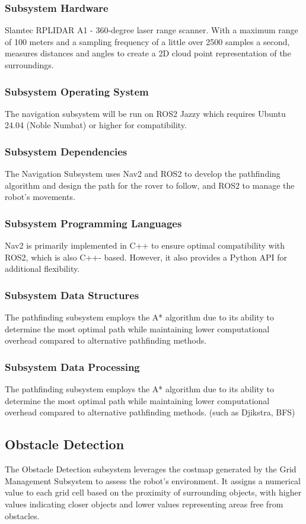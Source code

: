 \subsubsection{Subsystem Hardware}
Slamtec RPLIDAR A1 - 360-degree laser range scanner. With a maximum range of 100 meters and a sampling frequency of a little over 2500 samples a second, measures distances and angles to create a 2D cloud point representation of the surroundings.

\subsubsection{Subsystem Operating System}
The navigation subsystem will be run on ROS2 Jazzy which requires Ubuntu 24.04 (Noble Numbat) or higher for compatibility. 

\subsubsection{Subsystem Dependencies}
The Navigation Subsystem uses Nav2 and ROS2 to develop the pathfinding algorithm and design the path for the rover to follow, and ROS2 to manage the robot's movements.

\subsubsection{Subsystem Programming Languages}
Nav2 is primarily implemented in C++ to ensure optimal compatibility with ROS2, which is also C++-
based. However, it also provides a Python API for additional flexibility.
\subsubsection{Subsystem Data Structures}
The pathfinding subsystem employs the A* algorithm due to its ability to determine the most optimal
path while maintaining lower computational overhead compared to alternative pathfinding methods.
\subsubsection{Subsystem Data Processing}
The pathfinding subsystem employs the A* algorithm due to its ability to determine the most optimal path while maintaining lower computational overhead compared to alternative pathfinding methods. (such as Djikstra, BFS)

\newpage

\subsection{Obstacle Detection}
The Obstacle Detection subsystem leverages the costmap generated by the Grid Management Subsystem to assess the robot's environment. It assigns a numerical value to each grid cell based on the proximity of surrounding objects, with higher values indicating closer objects and lower values representing areas free from obstacles.

